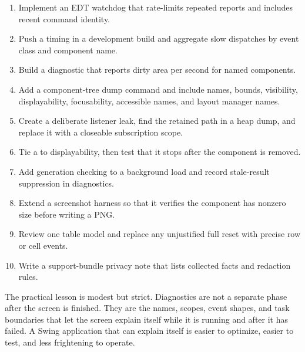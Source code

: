 \begin{exercisebox}
\begin{enumerate}
\item Implement an EDT watchdog that rate-limits repeated reports and includes recent command identity.
\item Push a timing  in a development build and aggregate slow dispatches by event class and component name.
\item Build a diagnostic  that reports dirty area per second for named components.
\item Add a component-tree dump command and include names, bounds, visibility, displayability, focusability, accessible names, and layout manager names.
\item Create a deliberate listener leak, find the retained path in a heap dump, and replace it with a closeable subscription scope.
\item Tie a  to displayability, then test that it stops after the component is removed.
\item Add generation checking to a background load and record stale-result suppression in diagnostics.
\item Extend a screenshot harness so that it verifies the component has nonzero size before writing a PNG.
\item Review one table model and replace any unjustified full reset with precise row or cell events.
\item Write a support-bundle privacy note that lists collected facts and redaction rules.
\end{enumerate}
\end{exercisebox}

The practical lesson is modest but strict. Diagnostics are not a separate phase after the screen is finished. They are the names, scopes, event shapes, and task boundaries that let the screen explain itself while it is running and after it has failed. A Swing application that can explain itself is easier to optimize, easier to test, and less frightening to operate.
